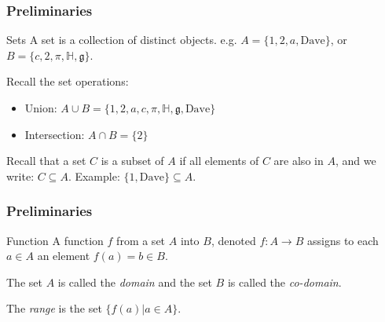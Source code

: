 \documentclass{beamer}
\begin{document}
\begin{frame}
  \frametitle{Preliminaries}
  \begin{block}{Sets}
    A set is a collection of distinct objects. e.g. $A = \{1,2,a,\mbox{Dave}\}$, or $B = \{c, 2, \pi, \mathbb{H}, \mathfrak{g}\}$.
  \end{block}
  Recall the set operations:
  \begin{itemize}
    \item Union: $A \cup B = \{1,2,a,c,\pi,\mathbb{H},\mathfrak{g},\mbox{Dave}\}$
    \item Intersection: $A \cap B = \{2\}$
  \end{itemize}
  Recall that a set $C$ is a subset of $A$ if all elements of $C$ are also in $A$, and we write: $C \subseteq A$. Example: $\{1,\mbox{Dave}\}\subseteq A$.
\end{frame}
\begin{frame}
  \frametitle{Preliminaries}
  \begin{block}{Function}
    A function $f$ from a set $A$ into $B$, denoted $f: A \rightarrow B$ assigns to each $a \in A$ an element $f(a) = b \in B$.

    The set $A$ is called the \emph{domain} and the set $B$ is called the \emph{co-domain}.

    The \emph{range} is the set $\{ f(a) | a \in A \}$.
  \end{block}
  \begin{example}
    \begin{center}
  \end{center}
  \end{example}
\end{frame}
\end{document}
